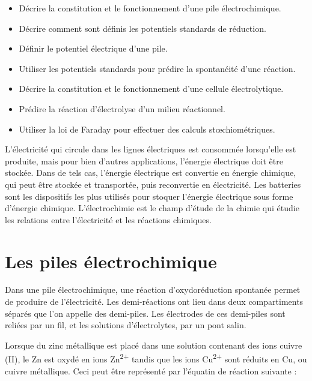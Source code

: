 \documentclass[
  11pt,
  a4paper,
  openany]{book}
\providecommand{\tightlist}{%
  \setlength{\itemsep}{0pt}\setlength{\parskip}{0pt}}
\begin{document}
\begin{objectives}

\begin{itemize}
\tightlist
\item
  Décrire la constitution et le fonctionnement d'une pile électrochimique.
\item
  Décrire comment sont définis les potentiels standards de réduction.
\item
  Définir le potentiel électrique d'une pile.
\item
  Utiliser les potentiels standards pour prédire la spontanéité d'une réaction.
\item
  Décrire la constitution et le fonctionnement d'une cellule électrolytique.
\item
  Prédire la réaction d'électrolyse d'un milieu réactionnel.
\item
  Utiliser la loi de Faraday pour effectuer des calculs stœchiométriques.
\end{itemize}

\end{objectives}

L'électricité qui circule dans les lignes électriques est consommée lorsqu'elle est produite, mais pour bien d'autres applications, l'énergie électrique doit être stockée. Dans de tels cas, l'énergie électrique est convertie en énergie chimique, qui peut être stockée et transportée, puis reconvertie en électricité. Les batteries sont les dispositifs les plus utilisés pour stoquer l'énergie électrique sous forme d'énergie chimique. L'électrochimie est le champ d'étude de la chimie qui étudie les relations entre l'électricité et les réactions chimiques.

\section{Les piles électrochimique}\label{les-piles-uxe9lectrochimique}

Dans une pile électrochimique, une réaction d'oxydoréduction spontanée permet de produire de l'électricité. Les demi-réactions ont lieu dans deux compartiments séparés que l'on appelle des demi-piles. Les électrodes de ces demi-piles sont reliées par un fil, et les solutions d'électrolytes, par un pont salin.

Lorsque du zinc métallique est placé dans une solution contenant des ions cuivre (II), le Zn est oxydé en ions Zn\textsuperscript{2+} tandis que les ions Cu\textsuperscript{2+} sont réduits en Cu, ou cuivre métallique. Ceci peut être représenté par l'équatin de réaction suivante :
\end{document}
